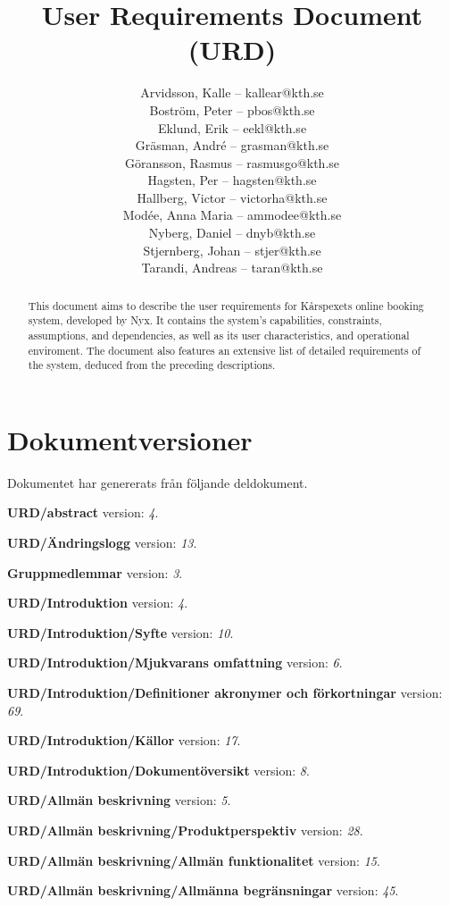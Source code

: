 \documentclass[a4paper, twoside, 11pt, titlepage]{article}
\author{
	\small
	Arvidsson, Kalle -- kallear@kth.se\\
	Boström, Peter -- pbos@kth.se\\
	Eklund, Erik -- eekl@kth.se\\
	Gräsman, André -- grasman@kth.se\\
	Göransson, Rasmus -- rasmusgo@kth.se\\
	Hagsten, Per -- hagsten@kth.se\\
	Hallberg, Victor -- victorha@kth.se\\
	Modée, Anna Maria -- ammodee@kth.se\\
	Nyberg, Daniel -- dnyb@kth.se\\
	Stjernberg, Johan -- stjer@kth.se\\
	Tarandi, Andreas -- taran@kth.se
	}
\title{User Requirements Document (URD)}
\begin{document}
\maketitle

\clearpage
\thispagestyle{empty}
\mbox{}
\newpage

\begin{abstract}
	This document aims to describe the user requirements for Kårspexets online booking system, developed by Nyx. It contains the system's capabilities, constraints, assumptions, and dependencies, as well as its user characteristics, and operational enviroment. The document also features an extensive list of detailed requirements of the system, deduced from the preceding descriptions.
\end{abstract}

\newpage

\setcounter{page}{1}

\startfooter

\clearpage
\section*{Dokumentversioner}


Dokumentet har genererats från följande deldokument.

\textbf{URD/abstract} version: \emph{4}.

\textbf{URD/Ändringslogg} version: \emph{13}.

\textbf{Gruppmedlemmar} version: \emph{3}.

\textbf{URD/Introduktion} version: \emph{4}.

\textbf{URD/Introduktion/Syfte} version: \emph{10}.

\textbf{URD/Introduktion/Mjukvarans omfattning} version: \emph{6}.

\textbf{URD/Introduktion/Definitioner akronymer och förkortningar} version: \emph{69}.

\textbf{URD/Introduktion/Källor} version: \emph{17}.

\textbf{URD/Introduktion/Dokumentöversikt} version: \emph{8}.

\textbf{URD/Allmän beskrivning} version: \emph{5}.

\textbf{URD/Allmän beskrivning/Produktperspektiv} version: \emph{28}.

\textbf{URD/Allmän beskrivning/Allmän funktionalitet} version: \emph{15}.

\textbf{URD/Allmän beskrivning/Allmänna begränsningar} version: \emph{45}.
\end{document}
